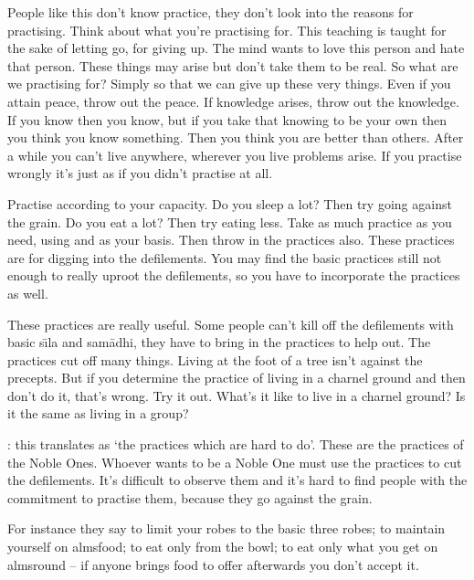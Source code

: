 People like this don't know practice, they don't look into the reasons for practising. Think about what you're practising for. This teaching is taught for the sake of letting go, for giving up. The mind wants to love this person and hate that person. These things may arise but don't take them to be real. So what are we practising for? Simply so that we can give up these very things. Even if you attain peace, throw out the peace. If knowledge arises, throw out the knowledge. If you know then you know, but if you take that knowing to be your own then you think you know something. Then you think you are better than others. After a while you can't live anywhere, wherever you live problems arise. If you practise wrongly it's just as if you didn't practise at all.

Practise according to your capacity. Do you sleep a lot? Then try going against the grain. Do you eat a lot? Then try eating less. Take as much practice as you need, using   and  as your basis. Then throw in the  practices also. These  practices are for digging into the defilements. You may find the basic practices still not enough to really uproot the defilements, so you have to incorporate the  practices as well.

These  practices are really useful. Some people can't kill off the defilements with basic s\={\i}la and sam\=adhi, they have to bring in the  practices to help out. The  practices cut off many things.  Living at the foot of a tree isn't against the precepts. But if you determine the  practice of living in a charnel ground and then don't do it, that's wrong. Try it out. What's it like to live in a charnel ground? Is it the same as living in a group?

: this translates as `the practices which are hard to do'. These are the practices of the Noble Ones. Whoever wants to be a Noble One must use the  practices to cut the defilements. It's difficult to observe them and it's hard to find people with the commitment to practise them, because they go against the grain.

For instance they say to limit your robes to the basic three robes; to maintain yourself on almsfood; to eat only from the bowl; to eat only what you get on almsround -- if anyone brings food to offer afterwards you don't accept it.

